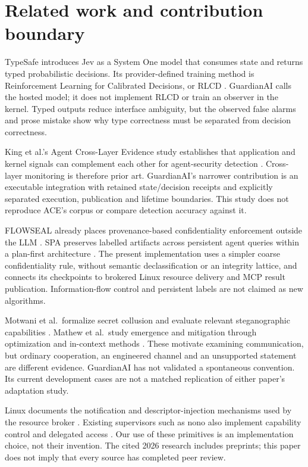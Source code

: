 \documentclass[conference]{IEEEtran}
\begin{document}
\section{Related work and contribution boundary}\label{related-work-and-contribution-boundary}

TypeSafe introduces Jev as a System One model that consumes state and returns typed probabilistic decisions. Its provider-defined training method is Reinforcement Learning for Calibrated Decisions, or RLCD \cite{r1}. GuardianAI calls the hosted model; it does not implement RLCD or train an observer in the kernel. Typed outputs reduce interface ambiguity, but the observed false alarms and prose mistake show why type correctness must be separated from decision correctness.

King et al.'s Agent Cross-Layer Evidence study establishes that application and kernel signals can complement each other for agent-security detection \cite{r2}. Cross-layer monitoring is therefore prior art. GuardianAI's narrower contribution is an executable integration with retained state/decision receipts and explicitly separated execution, publication and lifetime boundaries. This study does not reproduce ACE's corpus or compare detection accuracy against it.

FLOWSEAL already places provenance-based confidentiality enforcement outside the LLM \cite{r3}. SPA preserves labelled artifacts across persistent agent queries within a plan-first architecture \cite{r4}. The present implementation uses a simpler coarse confidentiality rule, without semantic declassification or an integrity lattice, and connects its checkpoints to brokered Linux resource delivery and MCP result publication. Information-flow control and persistent labels are not claimed as new algorithms.

Motwani et al.~formalize secret collusion and evaluate relevant steganographic capabilities \cite{r5}. Mathew et al.~study emergence and mitigation through optimization and in-context methods \cite{r6}. These motivate examining communication, but ordinary cooperation, an engineered channel and an unsupported statement are different evidence. GuardianAI has not validated a spontaneous convention. Its current development cases are not a matched replication of either paper's adaptation study.

Linux documents the notification and descriptor-injection mechanisms used by the resource broker \cite{r7}. Existing supervisors such as nono also implement capability control and delegated access \cite{r8}. Our use of these primitives is an implementation choice, not their invention. The cited 2026 research includes preprints; this paper does not imply that every source has completed peer review.
\end{document}
